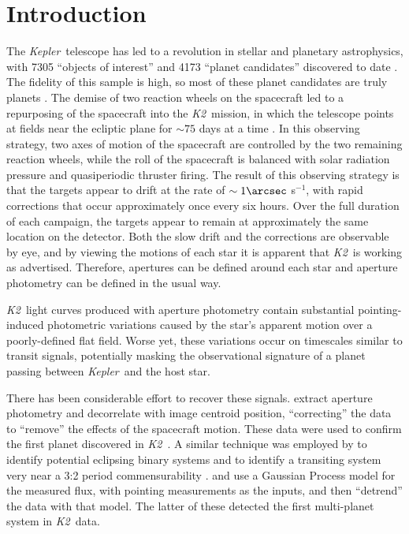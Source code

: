 \documentclass{emulateapj}
\newcommand{\project}[1]{\textsl{#1}}
\newcommand{\kep}{\project{Kepler}}
\newcommand{\KT}{\project{K2}}
\begin{document}
\section{Introduction}
The \kep\ telescope \citep{Borucki10} has led to a revolution in stellar and planetary 
astrophysics, with 7305 ``objects of interest'' and 4173 ``planet candidates''
discovered to date \citep{Borucki11a, Borucki11b, Batalha13, Burke14, Rowe15, Mullaly15}.
The fidelity of this sample is high, so most of these planet candidates are truly planets
\citep{Morton11b, Fressin13}.
The demise of two reaction wheels on the spacecraft led to a repurposing 
of the spacecraft into the \KT\ mission, in which the telescope points at
fields near the ecliptic plane for $\sim 75$ days at a time \citep{Howell14}.
In this observing strategy, two axes of motion of the spacecraft are 
controlled by the two remaining reaction wheels, while the roll of the 
spacecraft is balanced with solar radiation pressure and quasiperiodic 
thruster firing.
The result of this observing strategy is that the targets appear to drift
at the rate of $\sim 1\arcsec$ s$^{-1}$, with rapid corrections that occur
approximately once every six hours.
Over the full duration of each campaign, the targets appear to remain at 
approximately the same location on the detector.
Both the slow drift and the corrections are observable by eye, and by viewing the
motions of each star \citep{Barentsen15} it is apparent that \KT\ is working as 
advertised.
Therefore, apertures can be defined around each star and aperture photometry can be
defined in the usual way.

\KT\ light curves produced with aperture photometry contain substantial pointing-induced
photometric variations caused by the star's apparent motion over a poorly-defined flat 
field. 
Worse yet, these variations occur on timescales similar to transit signals, potentially
masking the observational signature of a planet passing between \kep\ and the host star.

There has been considerable effort to recover these signals.
\citet{Vanderburg14} extract aperture photometry and decorrelate with image centroid
position, ``correcting'' the data to ``remove'' the effects of the spacecraft motion.
These data were used to confirm the first planet discovered in \KT\ \citep{Vanderburg15}.
A similar technique was employed by \citet{Armstrong15a} to identify potential eclipsing
binary systems and to identify a transiting system very near a 3:2 period commensurability
\citep{Armstrong15b}.
\citet{Aigrain15} and \citet{Crossfield15} use a Gaussian Process model for the measured
flux, with pointing measurements as the inputs, and then “detrend” the data with that model.
The latter of these detected the first multi-planet system in \KT\ data.
\end{document}
